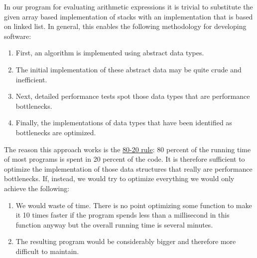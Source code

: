 \begin{enumerate}
       In our program for evaluating  arithmetic expressions it is trivial to substitute the given
       array based implementation of stacks with an implementation that is based on linked list.  In general,
       this enables the following methodology for developing software:  
       \begin{enumerate}
       \item First, an algorithm is implemented using abstract data types.
       \item The initial implementation of these abstract data may be quite crude and inefficient.
       \item Next, detailed performance tests spot those data types that are performance 
             bottlenecks.
       \item Finally, the implementations of data types that have been identified as bottlenecks are optimized.
       \end{enumerate}
       The reason this approach works is the 
       \href{http://en.wikipedia.org/wiki/Pareto_principle#In_software}{80-20 rule}:  
       80 percent of the running time of most programs is spent in 20 percent of the code.  It is
       therefore sufficient to optimize the 
       implementation of those data structures that really are performance bottlenecks.  If,
       instead, we would try to optimize everything we would only achieve the following:
       \begin{enumerate}
       \item We would waste of time.  There is no point optimizing some function to make it 10 times
             faster if the program spends less than a millisecond in this function anyway but the
             overall running time is several minutes.
       \item The resulting program would be considerably bigger and therefore more difficult to 
             maintain.
       \end{enumerate}
 \end{enumerate}




